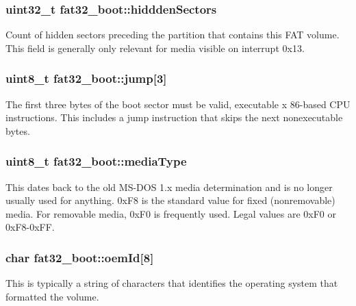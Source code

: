 \subsubsection[{\texorpdfstring{hiddden\+Sectors}{hidddenSectors}}]{\setlength{\rightskip}{0pt plus 5cm}uint32\+\_\+t fat32\+\_\+boot\+::hiddden\+Sectors}\hypertarget{structfat32__boot_ab10224aa4bba42b262fcd3479e279e1f}{}\label{structfat32__boot_ab10224aa4bba42b262fcd3479e279e1f}
Count of hidden sectors preceding the partition that contains this F\+AT volume. This field is generally only relevant for media visible on interrupt 0x13. 
\subsubsection[{\texorpdfstring{jump}{jump}}]{\setlength{\rightskip}{0pt plus 5cm}uint8\+\_\+t fat32\+\_\+boot\+::jump\mbox{[}3\mbox{]}}\hypertarget{structfat32__boot_a2d93fc193a64ecffbd71ead207fe4810}{}\label{structfat32__boot_a2d93fc193a64ecffbd71ead207fe4810}
The first three bytes of the boot sector must be valid, executable x 86-\/based C\+PU instructions. This includes a jump instruction that skips the next nonexecutable bytes. 
\subsubsection[{\texorpdfstring{media\+Type}{mediaType}}]{\setlength{\rightskip}{0pt plus 5cm}uint8\+\_\+t fat32\+\_\+boot\+::media\+Type}\hypertarget{structfat32__boot_a3b1ab5d2dc872c0d80cd4f34622de417}{}\label{structfat32__boot_a3b1ab5d2dc872c0d80cd4f34622de417}
This dates back to the old M\+S-\/\+D\+OS 1.\+x media determination and is no longer usually used for anything. 0x\+F8 is the standard value for fixed (nonremovable) media. For removable media, 0x\+F0 is frequently used. Legal values are 0x\+F0 or 0x\+F8-\/0x\+FF. 
\subsubsection[{\texorpdfstring{oem\+Id}{oemId}}]{\setlength{\rightskip}{0pt plus 5cm}char fat32\+\_\+boot\+::oem\+Id\mbox{[}8\mbox{]}}\hypertarget{structfat32__boot_af623a473a960ea20904dce0edfb6bb9d}{}\label{structfat32__boot_af623a473a960ea20904dce0edfb6bb9d}
This is typically a string of characters that identifies the operating system that formatted the volume. 
